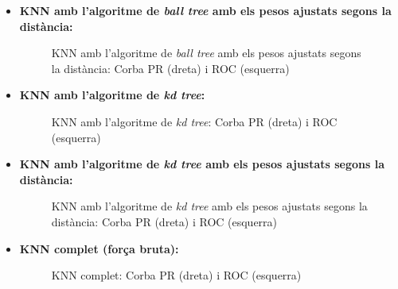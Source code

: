 \documentclass[a4paper, 11pt]{article}
\begin{document}
\begin{itemize}
            \item \textbf{KNN amb l'algoritme de \textit{ball tree} amb els pesos ajustats segons la distància:}


                \begin{figure}[H]%
                \centering
                \qquad
                \caption*{KNN amb l'algoritme de \textit{ball tree} amb els pesos ajustats segons la distància: Corba PR (dreta) i ROC (esquerra)}
                \end{figure}

            \newpage
            \item \textbf{KNN amb l'algoritme de \textit{kd tree}:}


                \begin{figure}[H]%
                \centering
                \qquad
                \caption*{KNN amb l'algoritme de \textit{kd tree}: Corba PR (dreta) i ROC (esquerra)}
                \end{figure}

            \item \textbf{KNN amb l'algoritme de \textit{kd tree} amb els pesos ajustats segons la distància:}


                \begin{figure}[H]%
                \centering
                \qquad
                \caption*{KNN amb l'algoritme de \textit{kd tree} amb els pesos ajustats segons la distància: Corba PR (dreta) i ROC (esquerra)}
                \end{figure}
            \newpage
            \item \textbf{KNN complet (força bruta):}


                \begin{figure}[H]%
                \centering
                \qquad
                \caption*{KNN complet: Corba PR (dreta) i ROC (esquerra)}
                \end{figure}


\end{itemize}
\end{document}
